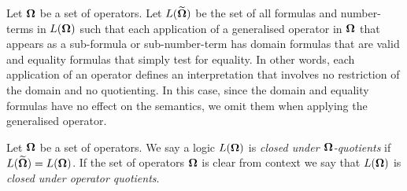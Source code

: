 \documentclass[../main/thesis.tex]{subfiles}
\begin{document}


Let $\mathbf{\mathbf{\Omega}}$ be a set of operators. Let $L(\widetilde{\mathbf{\mathbf{\Omega}}})$ be the set of
all formulas and number-terms in $L(\mathbf{\mathbf{\Omega}})$ such that each application of a
generalised operator in $\mathbf{\mathbf{\Omega}}$ that appears as a sub-formula or
sub-number-term has domain formulas that are valid and equality formulas that
simply test for equality. In other words, each application of an operator
defines an interpretation that involves no restriction of the domain and no
quotienting. In this case, since the domain and equality formulas have no effect
on the semantics, we omit them when applying the generalised operator.

\begin{definition}
  Let $\mathbf{\mathbf{\Omega}}$ be a set of operators. We say a logic $L(\mathbf{\mathbf{\Omega}})$ is \emph{closed
    under $\mathbf{\mathbf{\Omega}}$-quotients} if $L(\widetilde{\mathbf{\mathbf{\Omega}}}) = L(\mathbf{\mathbf{\Omega}})$. If the set
  of operators $\mathbf{\mathbf{\Omega}}$ is clear from context we say that $L(\mathbf{\mathbf{\Omega}})$ is
  \emph{closed under operator quotients}.
\end{definition}
\end{document}
